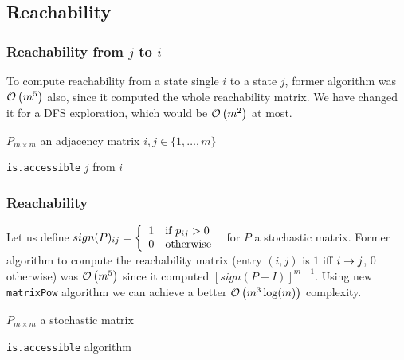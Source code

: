 \subsection{Reachability}
 \begin{frame}\frametitle{Reachability from $j$ to $i$}
    \vspace{2.5em}
    
    To compute reachability from a state single \(i\) to a state \(j\), former 
    algorithm was \(\mathcal{O}\left(m^5\right)\) also, since it computed the whole reachability 
    matrix. We have  changed it for a DFS exploration, which would be \(\mathcal{O}\left(m^2\right)\) 
    at most.
    \vspace{-1em}
    
    \begin{algorithm}[H]
    \begin{algorithmic}[1]
    \REQUIRE $P_{m \times m}$ an adjacency matrix
    \REQUIRE $i,j \in \{1, \ldots, m\}$
    \NEWLINE
        \ENDIF
        \ENDFOR
    \ENDWHILE
    \end{algorithmic}
    \caption{\texttt{is.accessible} $j$ from $i$}
    \label{alg:is.accessible.i.j}
    \end{algorithm}

\end{frame}

\begin{frame} \frametitle{Reachability}
    Let us define \(sign(P)_{ij} = \left\{\begin{array}{ll} 1 & \textrm{if } p_{ij} > 0 \\ 0 & \textrm{otherwise } \end{array}\right.\) for \(P\) a 
    stochastic matrix. Former algorithm to compute the reachability matrix (entry 
    \((i, j)\) is \(1\) iff \(i \rightarrow j\), \(0\) otherwise) was \(\mathcal{O}\left(m^5\right)\) since 
    it computed \(\left[sign(P + I)\right]^{m - 1}\). Using  new \texttt{matrixPow} 
    algorithm we can achieve a better \(\mathcal{O}\left(m^3 \log(m)\right)\) complexity.

    \begin{algorithm}[H]
    \begin{algorithmic}[1]
    \REQUIRE $P_{m \times m}$ a stochastic matrix
    \NEWLINE
    \end{algorithmic}
    \caption{\texttt{is.accessible} algorithm}
    \label{alg:is.accessible}
    \end{algorithm}

\end{frame}


